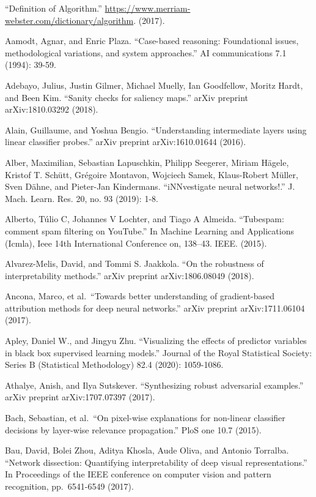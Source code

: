 \documentclass[
  10pt,
]{scrbook}
\begin{document}
``Definition of Algorithm.'' \url{https://www.merriam-webster.com/dictionary/algorithm}. (2017).

Aamodt, Agnar, and Enric Plaza. ``Case-based reasoning: Foundational issues, methodological variations, and system approaches.'' AI communications 7.1 (1994): 39-59.

Adebayo, Julius, Justin Gilmer, Michael Muelly, Ian Goodfellow, Moritz Hardt, and Been Kim. ``Sanity checks for saliency maps.'' arXiv preprint arXiv:1810.03292 (2018).

Alain, Guillaume, and Yoshua Bengio. ``Understanding intermediate layers using linear classifier probes.'' arXiv preprint arXiv:1610.01644 (2016).

Alber, Maximilian, Sebastian Lapuschkin, Philipp Seegerer, Miriam Hägele, Kristof T. Schütt, Grégoire Montavon, Wojciech Samek, Klaus-Robert Müller, Sven Dähne, and Pieter-Jan Kindermans. ``iNNvestigate neural networks!.'' J. Mach. Learn. Res. 20, no. 93 (2019): 1-8.

Alberto, Túlio C, Johannes V Lochter, and Tiago A Almeida. ``Tubespam: comment spam filtering on YouTube.'' In Machine Learning and Applications (Icmla), Ieee 14th International Conference on, 138--43. IEEE. (2015).

Alvarez-Melis, David, and Tommi S. Jaakkola. ``On the robustness of interpretability methods.'' arXiv preprint arXiv:1806.08049 (2018).

Ancona, Marco, et al.~``Towards better understanding of gradient-based attribution methods for deep neural networks.'' arXiv preprint arXiv:1711.06104 (2017).

Apley, Daniel W., and Jingyu Zhu. ``Visualizing the effects of predictor variables in black box supervised learning models.'' Journal of the Royal Statistical Society: Series B (Statistical Methodology) 82.4 (2020): 1059-1086.

Athalye, Anish, and Ilya Sutskever. ``Synthesizing robust adversarial examples.'' arXiv preprint arXiv:1707.07397 (2017).

Bach, Sebastian, et al.~``On pixel-wise explanations for non-linear classifier decisions by layer-wise relevance propagation.'' PloS one 10.7 (2015).

Bau, David, Bolei Zhou, Aditya Khosla, Aude Oliva, and Antonio Torralba. ``Network dissection: Quantifying interpretability of deep visual representations.'' In Proceedings of the IEEE conference on computer vision and pattern recognition, pp.~6541-6549 (2017).
\end{document}
